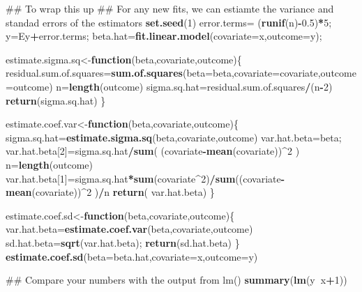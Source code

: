 \documentclass[12pt,]{book}
\newenvironment{Shaded}{\begin{snugshade}}{\end{snugshade}}
\newcommand{\KeywordTok}[1]{\textcolor[rgb]{0.13,0.29,0.53}{\textbf{#1}}}
\newcommand{\DataTypeTok}[1]{\textcolor[rgb]{0.13,0.29,0.53}{#1}}
\newcommand{\DecValTok}[1]{\textcolor[rgb]{0.00,0.00,0.81}{#1}}
\newcommand{\FloatTok}[1]{\textcolor[rgb]{0.00,0.00,0.81}{#1}}
\newcommand{\StringTok}[1]{\textcolor[rgb]{0.31,0.60,0.02}{#1}}
\newcommand{\ControlFlowTok}[1]{\textcolor[rgb]{0.13,0.29,0.53}{\textbf{#1}}}
\newcommand{\OperatorTok}[1]{\textcolor[rgb]{0.81,0.36,0.00}{\textbf{#1}}}
\newcommand{\NormalTok}[1]{#1}
\begin{document}
\begin{Shaded}
\begin{Highlighting}[]
\NormalTok{## To wrap this up}
\NormalTok{## For any new fits, we can estiamte the variance and standad errors of the estimators }
\KeywordTok{set.seed}\NormalTok{(}\DecValTok{1}\NormalTok{)}
\NormalTok{error.terms=}\StringTok{ }\NormalTok{(}\KeywordTok{runif}\NormalTok{(n)}\OperatorTok{-}\FloatTok{0.5}\NormalTok{)}\OperatorTok{*}\DecValTok{5}\NormalTok{;}
\NormalTok{y=Ey}\OperatorTok{+}\NormalTok{error.terms;}
\NormalTok{beta.hat=}\KeywordTok{fit.linear.model}\NormalTok{(}\DataTypeTok{covariate=}\NormalTok{x,}\DataTypeTok{outcome=}\NormalTok{y);}

\NormalTok{estimate.sigma.sq<-}\ControlFlowTok{function}\NormalTok{(beta,covariate,outcome)\{}
\NormalTok{   residual.sum.of.squares=}\KeywordTok{sum.of.squares}\NormalTok{(}\DataTypeTok{beta=}\NormalTok{beta,}\DataTypeTok{covariate=}\NormalTok{covariate,}\DataTypeTok{outcome=}\NormalTok{outcome)}
\NormalTok{   n=}\KeywordTok{length}\NormalTok{(outcome)}
\NormalTok{   sigma.sq.hat=residual.sum.of.squares}\OperatorTok{/}\NormalTok{(n}\OperatorTok{-}\DecValTok{2}\NormalTok{) }
   \KeywordTok{return}\NormalTok{(sigma.sq.hat)}
\NormalTok{\}}

\NormalTok{estimate.coef.var<-}\ControlFlowTok{function}\NormalTok{(beta,covariate,outcome)\{}
\NormalTok{  sigma.sq.hat=}\KeywordTok{estimate.sigma.sq}\NormalTok{(beta,covariate,outcome)}
\NormalTok{  var.hat.beta=beta;}
\NormalTok{  var.hat.beta[}\DecValTok{2}\NormalTok{]=sigma.sq.hat}\OperatorTok{/}\KeywordTok{sum}\NormalTok{(  (covariate}\OperatorTok{-}\KeywordTok{mean}\NormalTok{(covariate))}\OperatorTok{^}\DecValTok{2}\NormalTok{  ) }
\NormalTok{  n=}\KeywordTok{length}\NormalTok{(outcome)}
\NormalTok{  var.hat.beta[}\DecValTok{1}\NormalTok{]=sigma.sq.hat}\OperatorTok{*}\KeywordTok{sum}\NormalTok{(covariate}\OperatorTok{^}\DecValTok{2}\NormalTok{)}\OperatorTok{/}\KeywordTok{sum}\NormalTok{((covariate}\OperatorTok{-}\KeywordTok{mean}\NormalTok{(covariate))}\OperatorTok{^}\DecValTok{2}\NormalTok{  )}\OperatorTok{/}\NormalTok{n}
  \KeywordTok{return}\NormalTok{( var.hat.beta)}
\NormalTok{\}}

\NormalTok{estimate.coef.sd<-}\ControlFlowTok{function}\NormalTok{(beta,covariate,outcome)\{}
\NormalTok{  var.hat.beta=}\KeywordTok{estimate.coef.var}\NormalTok{(beta,covariate,outcome)}
\NormalTok{ sd.hat.beta=}\KeywordTok{sqrt}\NormalTok{(var.hat.beta);}
  \KeywordTok{return}\NormalTok{(sd.hat.beta)}
\NormalTok{\}}
\KeywordTok{estimate.coef.sd}\NormalTok{(}\DataTypeTok{beta=}\NormalTok{beta.hat,}\DataTypeTok{covariate=}\NormalTok{x,}\DataTypeTok{outcome=}\NormalTok{y)}

\NormalTok{## Compare your numbers with the output from lm()}
\KeywordTok{summary}\NormalTok{(}\KeywordTok{lm}\NormalTok{(y}\OperatorTok{~}\NormalTok{x}\OperatorTok{+}\DecValTok{1}\NormalTok{))}
\end{Highlighting}
\end{Shaded}
\end{document}
